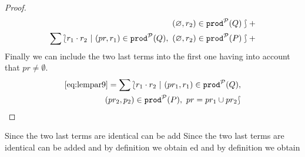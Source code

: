 \begin{proof}
\begin{equation}
\begin{split}
        (\varnothing,r_{2})\in\mathtt{prod}^{\cal P}(Q)\rbag+\\
        \sum\lbag  r_{1}\cdot r_{2}\ |\
        (pr,r_{1})\in\mathtt{prod}^{\cal P}(Q),\
        (\varnothing,r_{2})\in\mathtt{prod}^{\cal P}(P)\rbag+\\
      \end{split}
    \end{equation}
    Finally we can include the two last terms into the first one
    having into account that $pr\neq\emptyset$.
    \begin{equation}\label{eq:lempar10}
      \begin{split}
        \eqref{eq:lempar9} =
        \sum\lbag r_{1}\cdot r_{2}\ |\ (pr_{1},r_{1})\in\mathtt{prod}^{\cal P}(Q),\\ (pr_{2},p_{2})\in\mathtt{prod}^{\cal P}(P),\
        pr = pr_{1}\cup pr_{2}\rbag
      \end{split}
    \end{equation}
  \end{proof}
\elem


    Since the two last terms are identical can be add    Since the two last terms are identical can be added and by
    definition we obtain
ed and by
    definition we obtain


